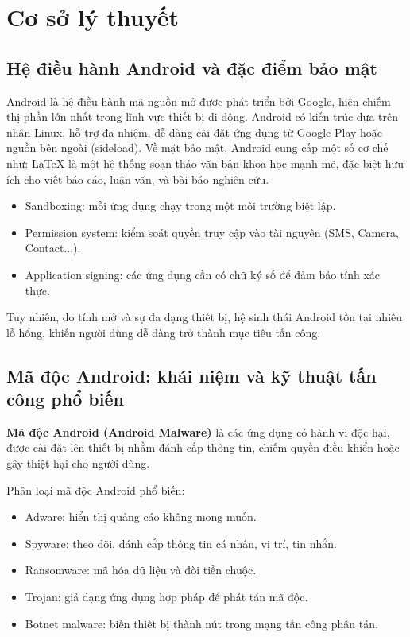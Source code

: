 \chapter{Cơ sở lý thuyết}
\section{Hệ điều hành Android và đặc điểm bảo mật}
Android là hệ điều hành mã nguồn mở được phát triển bởi Google, hiện chiếm thị phần lớn nhất trong lĩnh vực thiết bị di động. Android có kiến trúc dựa trên nhân Linux, hỗ trợ đa nhiệm, dễ dàng cài đặt ứng dụng từ Google Play hoặc nguồn bên ngoài (sideload).
Về mặt bảo mật, Android cung cấp một số cơ chế như:
LaTeX là một hệ thống soạn thảo văn bản khoa học mạnh mẽ, đặc biệt hữu ích cho viết báo cáo, luận văn, và bài báo nghiên cứu.

\begin{itemize}
    \item Sandboxing: mỗi ứng dụng chạy trong một môi trường biệt lập.
    \item Permission system: kiểm soát quyền truy cập vào tài nguyên (SMS, Camera, Contact...).
    \item Application signing: các ứng dụng cần có chữ ký số để đảm bảo tính xác thực.
\end{itemize}

Tuy nhiên, do tính mở và sự đa dạng thiết bị, hệ sinh thái Android tồn tại nhiều lỗ hổng, khiến người dùng dễ dàng trở thành mục tiêu tấn công.

\section{Mã độc Android: khái niệm và kỹ thuật tấn công phổ biến}

\textbf{Mã độc Android (Android Malware)}\cite{10.1145/3503463} là các ứng dụng có hành vi độc hại, được cài đặt lên thiết bị nhằm đánh cắp thông tin, chiếm quyền điều khiển hoặc gây thiệt hại cho người dùng.

Phân loại mã độc Android phổ biến:
\begin{itemize}
    \item Adware: hiển thị quảng cáo không mong muốn.
    \item Spyware: theo dõi, đánh cắp thông tin cá nhân, vị trí, tin nhắn.
    \item Ransomware: mã hóa dữ liệu và đòi tiền chuộc.
    \item Trojan: giả dạng ứng dụng hợp pháp để phát tán mã độc.
    \item Botnet malware: biến thiết bị thành nút trong mạng tấn công phân tán.
\end{itemize}

